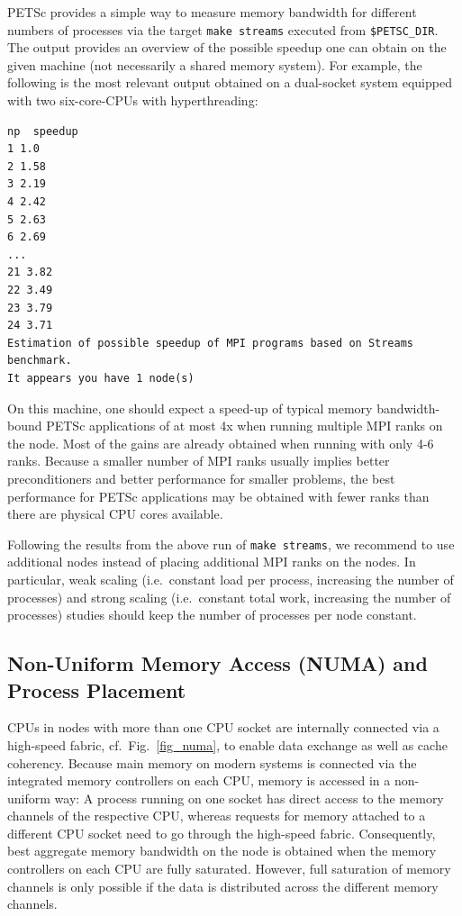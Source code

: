 {{%
PETSc provides a simple way to measure memory bandwidth for different numbers of processes via the target \lstinline|make streams| executed from \lstinline|$PETSC_DIR|.
The output provides an overview of the possible speedup one can obtain on the given machine (not necessarily a shared memory system).
For example, the following is the most relevant output obtained on a dual-socket system equipped with two six-core-CPUs with hyperthreading:
\begin{lstlisting}
np  speedup
1 1.0
2 1.58
3 2.19
4 2.42
5 2.63
6 2.69
...
21 3.82
22 3.49
23 3.79
24 3.71
Estimation of possible speedup of MPI programs based on Streams benchmark.
It appears you have 1 node(s)
\end{lstlisting}
On this machine, one should expect a speed-up of typical memory bandwidth-bound PETSc applications of at most 4x when running multiple MPI ranks on the node.
Most of the gains are already obtained when running with only 4-6 ranks.
Because a smaller number of MPI ranks usually implies better preconditioners and better performance for smaller problems, the best performance for PETSc applications may be obtained with fewer ranks than there are physical CPU cores available.

Following the results from the above run of \lstinline|make streams|, we recommend to use additional nodes instead of placing additional MPI ranks on the nodes.
In particular, weak scaling (i.e.~constant load per process, increasing the number of processes) and strong scaling (i.e.~constant total work, increasing the number of processes) studies should keep the number of processes per node constant.

\subsection{Non-Uniform Memory Access (NUMA) and Process Placement}
CPUs in nodes with more than one CPU socket are internally connected via a high-speed fabric, cf.~Fig.~\ref{fig_numa}, to enable data exchange as well as cache coherency.
Because main memory on modern systems is connected via the integrated memory controllers on each CPU, memory is accessed in a non-uniform way:
A process running on one socket has direct access to the memory channels of the respective CPU, whereas requests for memory attached to a different CPU socket need to go through the high-speed fabric.
Consequently, best aggregate memory bandwidth on the node is obtained when the memory controllers on each CPU are fully saturated.
However, full saturation of memory channels is only possible if the data is distributed across the different memory channels.

}}
